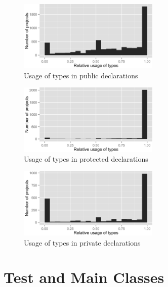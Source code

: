 \begin{figure}[h]
\centering 
\includegraphics[width=0.6\textwidth]{../aosd_2014/analysis/result/all/histograms/13_Public.png} 
\caption{Usage of types in public declarations}
\end{figure}

\begin{figure}[h]
\centering 
\includegraphics[width=0.6\textwidth]{../aosd_2014/analysis/result/all/histograms/12_Protected.png} 
\caption{Usage of types in protected declarations}
\end{figure}

\begin{figure}[h]
\centering 
\includegraphics[width=0.6\textwidth]{../aosd_2014/analysis/result/all/histograms/11_Private.png} 
\caption{Usage of types in private declarations}
\end{figure}

\FloatBarrier
\section{Test and Main Classes\label{a:test}}


